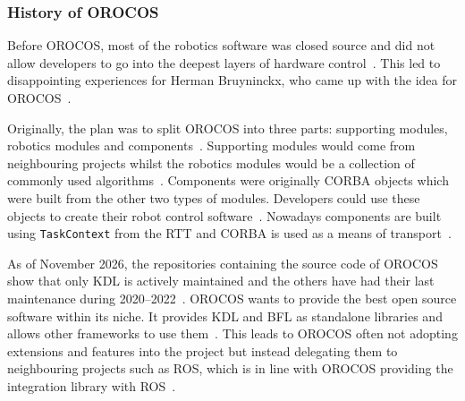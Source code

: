 \documentclass[a4paper]{book}
\begin{document}
\subsubsection{History of OROCOS}
Before OROCOS, most of the robotics software was closed source and did not allow
developers to go into the deepest layers of hardware
control~\cite{bruyninckx2001open, orocos_history}. This led to disappointing
experiences for Herman Bruyninckx, who came up with the idea for
OROCOS~\cite{orocos_history}.
\par
Originally, the plan was to split OROCOS into three parts: supporting modules,
robotics modules and components~\cite{bruyninckx2001open}. Supporting modules
would come from neighbouring projects whilst the robotics modules would be a
collection of commonly used algorithms~\cite{bruyninckx2001open}. Components
were originally CORBA objects which were built from the other two types of
modules. Developers could use these objects to create their robot control
software~\cite{bruyninckx2001open}. Nowadays components are built using
\texttt{TaskContext} from the RTT and CORBA is used as a means of
transport~\cite{orocos_rtt_manual}.
\par
As of November 2026, the repositories containing the source code of OROCOS show
that only KDL is actively maintained and the others have had their last
maintenance during 2020--2022~\cite{orocos_kdl_repo, orocos_rtt_repo,
orocos_ocl_repo, orocos_bfl_repo}. OROCOS wants to provide the best open source
software within its niche. It provides KDL and BFL as standalone libraries and
allows other frameworks to use them~\cite{orocos_history}. This leads to OROCOS
often not adopting extensions and features into the project but instead
delegating them to neighbouring projects such as ROS, which is in line with
OROCOS providing the integration library with ROS~\cite{orocos_history,
orocos_rtt_ros, orocos_rtt_ros2}.
\end{document}
